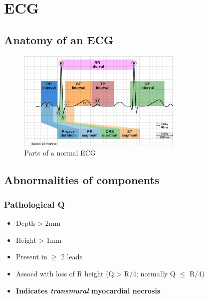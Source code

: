 \documentclass[
  12pt,
]{memoir}
\providecommand{\tightlist}{%
  \setlength{\itemsep}{0pt}\setlength{\parskip}{0pt}}
\begin{document}
\pagebreak

\hypertarget{ecg-1}{%
\section{ECG}\label{ecg-1}}

\label{sec:ecg}

\hypertarget{anatomy-of-an-ecg}{%
\subsection{Anatomy of an ECG}\label{anatomy-of-an-ecg}}

\begin{figure}[h!]
    \centering
    \includegraphics[width=0.7\textwidth]{../assets/med/ecg-anatomy.jpg}
    \caption{Parts of a normal ECG}
\end{figure}

\hypertarget{abnormalities-of-components}{%
\subsection{Abnormalities of
components}\label{abnormalities-of-components}}

\hypertarget{pathological-q}{%
\subsubsection{Pathological Q}\label{pathological-q}}

\begin{itemize}
\tightlist
\item
  Depth \textgreater{} 2mm
\item
  Height \textgreater{} 1mm
\item
  Present in \(\ge\) 2 leads
\item
  Assocd with loss of R height (Q \textgreater{} R/4; normally Q \(\le\)
  R/4)
\item
  \textbf{Indicates \emph{transmural} myocardial necrosis}
\end{itemize}
\end{document}
